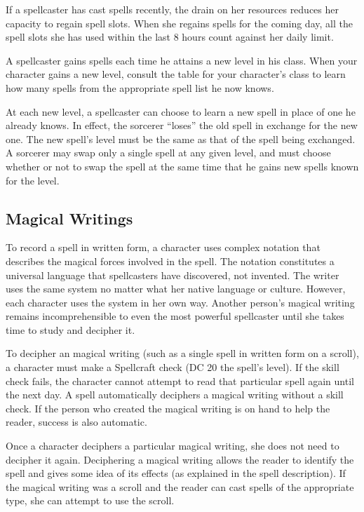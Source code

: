  If a spellcaster has cast spells recently, the drain on her resources reduces her capacity to regain spell slots. When she regains spells for the coming day, all the spell slots she has used within the last 8 hours count against her daily limit.

 A spellcaster gains spells each time he attains a new level in his class. When your character gains a new level, consult the table for your character's class to learn how many spells from the appropriate spell list he now knows.

 At each new level, a spellcaster can choose to learn a new spell in place of one he already knows. In effect, the sorcerer ``loses'' the old spell in exchange for the new one. The new spell's level must be the same as that of the spell being exchanged. A sorcerer may swap only a single spell at any given level, and must choose whether or not to swap the spell at the same time that he gains new spells known for the level.  

\subsection{Magical Writings}
To record a spell in written form, a character uses complex notation that describes the magical forces involved in the spell. The notation constitutes a universal language that spellcasters have discovered, not invented. The writer uses the same system no matter what her native language or culture. However, each character uses the system in her own way. Another person's magical writing remains incomprehensible to even the most powerful spellcaster until she takes time to study and decipher it.

To decipher an magical writing (such as a single spell in written form on a scroll), a character must make a Spellcraft check (DC 20 \add the spell's level). If the skill check fails, the character cannot attempt to read that particular spell again until the next day. A  spell automatically deciphers a magical writing without a skill check. If the person who created the magical writing is on hand to help the reader, success is also automatic.

Once a character deciphers a particular magical writing, she does not need to decipher it again. Deciphering a magical writing allows the reader to identify the spell and gives some idea of its effects (as explained in the spell description). If the magical writing was a scroll and the reader can cast spells of the appropriate type, she can attempt to use
the scroll.

